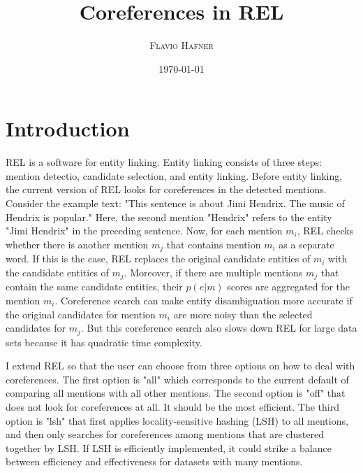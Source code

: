 \documentclass[a4paper,11pt]{article}
\numberwithin{equation}{section} %
\begin{document}
\title{Coreferences in REL
}



\author{\textsc{Flavio Hafner}
}

\date{\today}


\clearpage
\maketitle

\tableofcontents



\section{Introduction}

REL is a software for entity linking. Entity linking consists of three steps: mention detectio, candidate selection, and entity linking. Before entity linking, the current version of REL looks for coreferences in the detected mentions. Consider the example text: "This sentence is about Jimi Hendrix. The music of Hendrix is popular." Here, the second mention "Hendrix" refers to the entity "Jimi Hendrix" in the preceding sentence. Now, for each mention $m_i$, REL checks whether there is another mention $m_j$ that contains mention $m_i$ as a separate word. If this is the case, REL replaces the original candidate entities of $m_i$ with the candidate entities of $m_j$. Moreover, if there are multiple mentions $m_j$ that contain the same candidate entities, their $p(e|m)$ scores are aggregated for the mention $m_i$. Coreference search can make entity disambiguation more accurate if the original candidates for mention $m_i$ are more noisy than the selected candidates for $m_j$. 
But this coreference search also slows down REL for large data sets because it has quadratic time complexity.

I extend REL so that the user can choose from three options on how to deal with coreferences. The first option is "all" which corresponds to the current default of comparing all mentions with all other mentions. The second option is "off" that does not look for coreferences at all. It should be the most efficient. The third option is "lsh" that first applies locality-sensitive hashing (LSH) to all mentions, and then only searches for coreferences among mentions that are clustered together by LSH. If LSH is efficiently implemented, it could strike a balance between efficiency and effectiveness for datasets with many mentions. 
\end{document}
